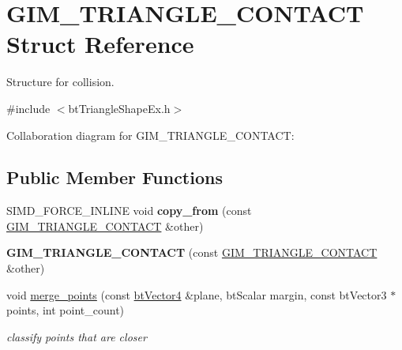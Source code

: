 \hypertarget{struct_g_i_m___t_r_i_a_n_g_l_e___c_o_n_t_a_c_t}{\section{G\+I\+M\+\_\+\+T\+R\+I\+A\+N\+G\+L\+E\+\_\+\+C\+O\+N\+T\+A\+C\+T Struct Reference}
\label{struct_g_i_m___t_r_i_a_n_g_l_e___c_o_n_t_a_c_t}
}


Structure for collision.  




{\ttfamily \#include $<$bt\+Triangle\+Shape\+Ex.\+h$>$}



Collaboration diagram for G\+I\+M\+\_\+\+T\+R\+I\+A\+N\+G\+L\+E\+\_\+\+C\+O\+N\+T\+A\+C\+T\+:
\subsection*{Public Member Functions}
\begin{DoxyCompactItemize}
\item 
\hypertarget{struct_g_i_m___t_r_i_a_n_g_l_e___c_o_n_t_a_c_t_a6f754844cd1c761a9786db64024a511c}{S\+I\+M\+D\+\_\+\+F\+O\+R\+C\+E\+\_\+\+I\+N\+L\+I\+N\+E void {\bfseries copy\+\_\+from} (const \hyperlink{struct_g_i_m___t_r_i_a_n_g_l_e___c_o_n_t_a_c_t}{G\+I\+M\+\_\+\+T\+R\+I\+A\+N\+G\+L\+E\+\_\+\+C\+O\+N\+T\+A\+C\+T} \&other)}\label{struct_g_i_m___t_r_i_a_n_g_l_e___c_o_n_t_a_c_t_a6f754844cd1c761a9786db64024a511c}

\item 
\hypertarget{struct_g_i_m___t_r_i_a_n_g_l_e___c_o_n_t_a_c_t_a8c551224af6537389660884a38073d1c}{{\bfseries G\+I\+M\+\_\+\+T\+R\+I\+A\+N\+G\+L\+E\+\_\+\+C\+O\+N\+T\+A\+C\+T} (const \hyperlink{struct_g_i_m___t_r_i_a_n_g_l_e___c_o_n_t_a_c_t}{G\+I\+M\+\_\+\+T\+R\+I\+A\+N\+G\+L\+E\+\_\+\+C\+O\+N\+T\+A\+C\+T} \&other)}\label{struct_g_i_m___t_r_i_a_n_g_l_e___c_o_n_t_a_c_t_a8c551224af6537389660884a38073d1c}

\item 
\hypertarget{struct_g_i_m___t_r_i_a_n_g_l_e___c_o_n_t_a_c_t_ac506be6f6fe6cb2f37b2890669f69266}{void \hyperlink{struct_g_i_m___t_r_i_a_n_g_l_e___c_o_n_t_a_c_t_ac506be6f6fe6cb2f37b2890669f69266}{merge\+\_\+points} (const \hyperlink{classbt_vector4}{bt\+Vector4} \&plane, bt\+Scalar margin, const bt\+Vector3 $\ast$points, int point\+\_\+count)}\label{struct_g_i_m___t_r_i_a_n_g_l_e___c_o_n_t_a_c_t_ac506be6f6fe6cb2f37b2890669f69266}

\begin{DoxyCompactList}\small\item\em classify points that are closer \end{DoxyCompactList}\end{DoxyCompactItemize}
